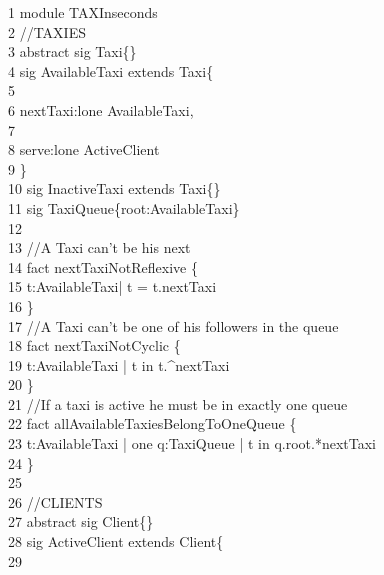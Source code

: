      1	{\color{blue}module} TAXInseconds\\
     2	{\color{green}//TAXIES}\\
     3	{\color{blue}abstract} {\color{blue}sig} Taxi\{\}\\
     4	{\color{blue}sig} AvailableTaxi {\color{blue}extends} Taxi\{\\
     5	\-\\
     6	\-\qquad nextTaxi:lone AvailableTaxi, \\
     7	\-\\
     8	\-\qquad serve:lone ActiveClient\\
     9	\}\\
    10	{\color{blue}sig} InactiveTaxi {\color{blue}extends} Taxi\{\}\\
    11	{\color{blue}sig} TaxiQueue\{root:AvailableTaxi\}\\
    12	\\
    13	{\color{green}//A Taxi can't be his next}\\
    14	{\color{blue}fact} nextTaxiNotReflexive \{ \\
    15	\- t:AvailableTaxi| t = t.nextTaxi \\
    16	\}\\
    17	{\color{green}//A Taxi can't be one of his followers in the queue}\\
    18	{\color{blue}fact} nextTaxiNotCyclic \{\\
    19	\- t:AvailableTaxi | t {\color{blue}in} t.\string^nextTaxi\\
    20	\} \\
    21	{\color{green}//If a taxi is active he must be in exactly one queue}\\
    22	{\color{blue}fact} allAvailableTaxiesBelongToOneQueue \{\\
    23	\- t:AvailableTaxi | {\color{blue}one} q:TaxiQueue | t {\color{blue}in} q.root.*nextTaxi\\
    24	\}\\
    25	\\
    26	{\color{green}//CLIENTS}\\
    27	{\color{blue}abstract} {\color{blue}sig} Client\{\}\\
    28	{\color{blue}sig} ActiveClient {\color{blue}extends} Client\{\\
    29	\-\\
